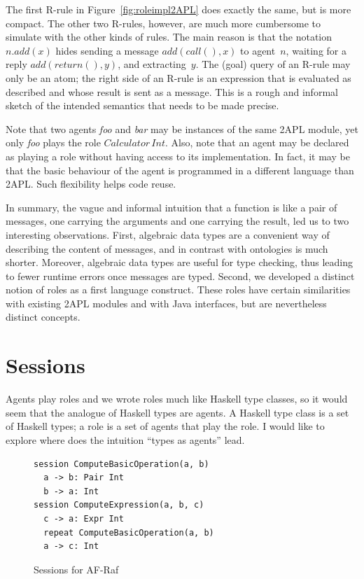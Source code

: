 \documentclass[a4paper,12pt,oneside,fleqn]{book} %
\begin{document}
The first R-rule in Figure~\ref{fig:roleimpl2APL} does exactly the same,
but is more compact. The other two R-rules, however, are much more
cumbersome to simulate with the other kinds of rules. The main reason is
that the notation $n.\mathit{add}(x)$ hides sending a message
$\mathit{add}(\mathit{call}(),x)$ to agent~$n$, waiting for a reply
$\mathit{add}(\mathit{return}(),y)$, and extracting~$y$. The (goal) query
of an R-rule may only be an atom; the right side of an R-rule is an
expression that is evaluated as described and whose result is sent as a
message.  This is a rough and informal sketch of the intended semantics
that needs to be made precise.

Note that two agents \textit{foo} and \textit{bar} may be instances of the
same 2APL module, yet only \textit{foo} plays the role
$\mathit{Calculator}\,\mathit{Int}$. Also, note that an agent may be
declared as playing a role without having access to its implementation. In
fact, it may be that the basic behaviour of the agent is programmed in a
different language than 2APL. Such flexibility helps code reuse.

In summary, the vague and informal intuition that a function is like a pair
of messages, one carrying the arguments and one carrying the result, led us
to two interesting observations. First, algebraic data types are a
convenient way of describing the content of messages, and in contrast with
ontologies is much shorter. Moreover, algebraic data types are useful for
type checking, thus leading to fewer runtime errors once messages are
typed. Second, we developed a distinct notion of roles as a first language
construct. These roles have certain similarities with existing 2APL modules
and with Java interfaces, but are nevertheless distinct concepts.

\section{Sessions}\label{sec:sessions} %

Agents play roles and we wrote roles much like Haskell type
classes, so it would seem that the analogue of Haskell types are
agents. A Haskell type class is a set of Haskell types; a role is a
set of agents that play the role. I would like to explore where
does the intuition ``types as agents'' lead.

\begin{figure}\footnotesize %
\begin{verbatim}
session ComputeBasicOperation(a, b)
  a -> b: Pair Int
  b -> a: Int
session ComputeExpression(a, b, c)
  c -> a: Expr Int
  repeat ComputeBasicOperation(a, b)
  a -> c: Int
\end{verbatim}
\caption{Sessions for AF-Raf}\label{fig:sessions}
\end{figure} %
\end{document}
